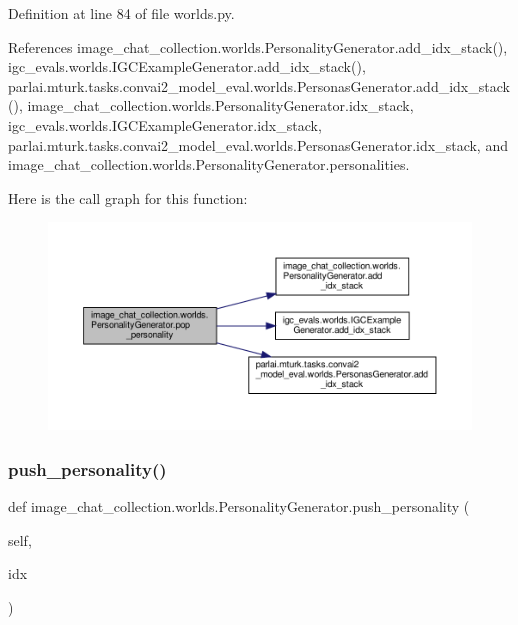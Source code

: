 Definition at line 84 of file worlds.\+py.



References image\+\_\+chat\+\_\+collection.\+worlds.\+Personality\+Generator.\+add\+\_\+idx\+\_\+stack(), igc\+\_\+evals.\+worlds.\+I\+G\+C\+Example\+Generator.\+add\+\_\+idx\+\_\+stack(), parlai.\+mturk.\+tasks.\+convai2\+\_\+model\+\_\+eval.\+worlds.\+Personas\+Generator.\+add\+\_\+idx\+\_\+stack(), image\+\_\+chat\+\_\+collection.\+worlds.\+Personality\+Generator.\+idx\+\_\+stack, igc\+\_\+evals.\+worlds.\+I\+G\+C\+Example\+Generator.\+idx\+\_\+stack, parlai.\+mturk.\+tasks.\+convai2\+\_\+model\+\_\+eval.\+worlds.\+Personas\+Generator.\+idx\+\_\+stack, and image\+\_\+chat\+\_\+collection.\+worlds.\+Personality\+Generator.\+personalities.

Here is the call graph for this function\+:
\nopagebreak
\begin{figure}[H]
\begin{center}
\leavevmode
\includegraphics[width=350pt]{classimage__chat__collection_1_1worlds_1_1PersonalityGenerator_ad35601df7a905c1e043c6fb1117db74e_cgraph}
\end{center}
\end{figure}
\mbox{\label{classimage__chat__collection_1_1worlds_1_1PersonalityGenerator_afbcf297c74564898b5c96d29c017c7b1}} 
\subsubsection{\texorpdfstring{push\+\_\+personality()}{push\_personality()}}
{\footnotesize\ttfamily def image\+\_\+chat\+\_\+collection.\+worlds.\+Personality\+Generator.\+push\+\_\+personality (\begin{DoxyParamCaption}\item[{}]{self,  }\item[{}]{idx }\end{DoxyParamCaption})}




